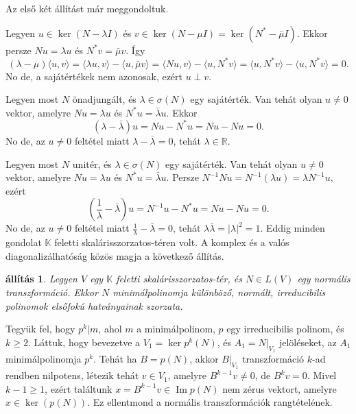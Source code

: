 \documentclass[a4paper, showtrims]{memoir}
\makeatletter
\renewenvironment{proof}[1][\proofname]
    {\par\pushQED{\qed}%
    \normalfont \topsep6\p@\@plus6\p@\relax
    \trivlist
    \item[\hskip\labelsep
        \itshape
    #1\@addpunct{:}]\ignorespaces}
    {\popQED\endtrivlist\@endpefalse}
\theoremstyle{plain}
\newtheorem{proposition}{állítás}[chapter]
\theoremstyle{remark}
\theoremstyle{definition}
\DeclareMathOperator{\im}{Im}
\newcommand{\ip}[2]{\langle#1,#2\rangle}
\makeatother
\begin{document}
\begin{proof}
	Az első két állítást már meggondoltuk.

	Legyen
	\begin{math}
		u\in\ker\left( N-\lambda I \right)
	\end{math}
	és
	\begin{math}
        v\in\ker\left( N-\mu I \right)=\ker\left( N^\ast-\bar{\mu}I \right)
	\end{math}.
	Ekkor persze
	\begin{math}
		Nu=\lambda u
	\end{math}
	és
	\begin{math}
		N^\ast v=\bar{\mu}v
	\end{math}.
	Így
	\[
		\left( \lambda-\mu \right)\ip{u}{v}
		=
		\ip{\lambda u}{v}-\ip{u}{\bar{\mu}v}
		=
		\ip{Nu}{v}-\ip{u}{N^\ast v}
		=
		\ip{u}{N^\ast v}-\ip{u}{N^\ast v}
		=
		0.
	\]
	No de, a sajátértékek nem azonosak,
	ezért $u\perp v$.

	Legyen most $N$ önadjungált, és $\lambda\in\sigma\left( N \right)$ egy sajátérték.
	Van tehát olyan $u\neq 0$ vektor, amelyre $Nu=\lambda u$ és $N^\ast u=\bar{\lambda}u$.
	Ekkor
	\[
		\left( \lambda-\bar{\lambda} \right)u
		=Nu-N^\ast u=Nu-Nu=0.
	\]
	No de, az $u\neq 0$ feltétel miatt $\lambda-\bar{\lambda}=0$, tehát $\lambda\in\mathbb{R}.$


	Legyen most $N$ unitér, és $\lambda\in\sigma\left( N \right)$ egy sajátérték.
	Van tehát olyan $u\neq 0$ vektor, amelyre $Nu=\lambda u$ és $N^\ast u=\bar{\lambda}u$.
    Persze $N^{-1}Nu=N^{-1}\left( \lambda u \right)=\lambda N^{-1}u$,
	ezért
	\[
        \left( \frac{1}{\lambda}-\bar{\lambda} \right)u
        =N^{-1}u-N^\ast u=Nu-Nu=0.
	\]
    No de, az $u\neq 0$ feltétel miatt $\frac{1}{\lambda}-\bar{\lambda}=0$, tehát $\lambda\bar{\lambda}=|\lambda|^2=1$.
\end{proof}
Eddig minden gondolat $\mathbb{K}$ feletti skalárisszorzatos-téren volt.
A komplex és a valós diagonalizálhatóság közös magja a következő állítás.
\begin{proposition}\label{pr:normalis-mult1}
	Legyen $V$ egy $\mathbb{K}$ feletti skalárisszorzatos-tér,
	és $N\in L\left( V \right)$ egy normális transzformáció.
	Ekkor $N$ minimálpolinomja különböző, normált, irreducibilis polinomok elsőfokú hatványainak szorzata.
\end{proposition}
\begin{proof}
	Tegyük fel, hogy $p^k|m$, ahol $m$ a minimálpolinom,
	$p$ egy irreducibilis polinom, és $k\geq 2.$
	Láttuk, hogy bevezetve a $V_1=\ker p^k\left( N \right)$, és
	$A_1=N|_{V_1}$ jelöléseket,
	az $A_1$ minimálpolinomja $p^k$.
	Tehát ha $B=p(N)$, akkor $B|_{V_1}$ transzformáció $k$-ad rendben nilpotens,
	létezik tehát $v\in V_1$,
	amelyre $B^{k-1}v\neq 0$,
	de $B^kv=0$.
	Mivel $k-1\geq 1$, ezért találtunk $x=B^{k-1}v\in\im p\left( N \right)$
	nem zérus vektort,
	amelyre $x\in\ker(p\left( N \right))$.
	Ez ellentmond a normális transzformációk rangtételének.
\end{proof}
\end{document}

